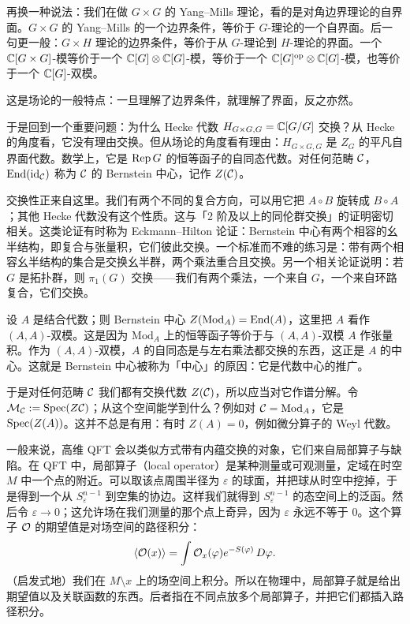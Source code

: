 再换一种说法：我们在做 $G\times G$ 的 Yang--Mills 理论，看的是对角边界理论的自界面。$G\times G$ 的 Yang--Mills 的一个边界条件，等价于 $G$-理论的一个自界面。后一句更一般：$G\times H$ 理论的边界条件，等价于从 $G$-理论到 $H$-理论的界面。一个 $\mathbb{C}[G\times G]$-模等价于一个 $\mathbb{C}[G]\otimes\mathbb{C}[G]$-模，等价于一个 $\mathbb{C}[G]^{\mathrm{op}}\otimes\mathbb{C}[G]$-模，也等价于一个 $\mathbb{C}[G]$-双模。

这是场论的一般特点：一旦理解了边界条件，就理解了界面，反之亦然。

于是回到一个重要问题：为什么 Hecke 代数 $H_{G\times G,G}=\mathbb{C}[G/G]$ 交换？从 Hecke 的角度看，它没有理由交换。但从场论的角度看有理由：$H_{G\times G,G}$ 是 $Z_G$ 的平凡自界面代数。数学上，它是 $\operatorname{Rep} G$ 的恒等函子的自同态代数。对任何范畴 $\mathcal{C}$，$\operatorname{End}(\operatorname{id}_{\mathcal{C}})$ 称为 $\mathcal{C}$ 的 Bernstein 中心，记作 $Z(\mathcal{C})$。

交换性正来自这里。我们有两个不同的复合方向，可以用它把 $A\circ B$ 旋转成 $B\circ A$；其他 Hecke 代数没有这个性质。这与「2 阶及以上的同伦群交换」的证明密切相关。这类论证有时称为 Eckmann--Hilton 论证：Bernstein 中心有两个相容的幺半结构，即复合与张量积，它们彼此交换。一个标准而不难的练习是：带有两个相容幺半结构的集合是交换幺半群，两个乘法重合且交换。另一个相关论证说明：若 $G$ 是拓扑群，则 $\pi_1(G)$ 交换——我们有两个乘法，一个来自 $G$，一个来自环路复合，它们交换。

设 $A$ 是结合代数；则 Bernstein 中心 $Z(\mathrm{Mod}_A)=\operatorname{End}(A)$，这里把 $A$ 看作 $(A,A)$-双模。这是因为 $\mathrm{Mod}_A$ 上的恒等函子等价于与 $(A,A)$-双模 $A$ 作张量积。作为 $(A,A)$-双模，$A$ 的自同态是与左右乘法都交换的东西，这正是 $A$ 的中心。这就是 Bernstein 中心被称为「中心」的原因：它是代数中心的推广。

于是对任何范畴 $\mathcal{C}$ 我们都有交换代数 $Z(\mathcal{C})$，所以应当对它作谱分解。令 $\mathcal{M}_{\mathcal{C}}:=\operatorname{Spec}(Z\mathcal{C})$；从这个空间能学到什么？例如对 $\mathcal{C}=\mathrm{Mod}_A$，它是 $\operatorname{Spec}(Z(A))$。这并不总是有用：有时 $Z(A)=0$，例如微分算子的 Weyl 代数。

一般来说，高维 QFT 会以类似方式带有内蕴交换的对象，它们来自局部算子与缺陷。在 QFT 中，局部算子（local operator）是某种测量或可观测量，定域在时空 $M$ 中一个点的附近。可以取该点周围半径为 $\varepsilon$ 的球面，并把球从时空中挖掉，于是得到一个从 $S^{n-1}_\varepsilon$ 到空集的协边。这样我们就得到 $S^{n-1}_\varepsilon$ 的态空间上的泛函。然后令 $\varepsilon\to0$；这允许场在我们测量的那个点上奇异，因为 $\varepsilon$ 永远不等于 $0$。这个算子 $\mathcal{O}$ 的期望值是对场空间的路径积分：
\[
\langle \mathcal{O}(x)\rangle=\int \mathcal{O}_x(\varphi)e^{-S(\varphi)}\,D\varphi .
\]
（启发式地）我们在 $M\setminus x$ 上的场空间上积分。所以在物理中，局部算子就是给出期望值以及关联函数的东西。后者指在不同点放多个局部算子，并把它们都插入路径积分。

